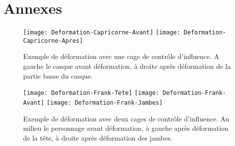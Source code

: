 
\chapter{Annexes}

\graphicspath{{Appendix1/Appendix1Figs/PNG/}{Appendix1/Appendix1Figs/PDF/}{Appendix1/Appendix1Figs/}}

\begin{figure}[ht]
  \begin{center}
    \texttt{[image: Deformation-Capricorne-Avant]}
    \texttt{[image: Deformation-Capricorne-Apres]}

    \caption{Exemple de déformation avec une cage de contrôle d'influence. A
gauche le casque avant déformation, à droite après déformation de la
partie basse du casque.}

  \end{center}
\end{figure}

\begin{figure}[ht]
  \begin{center}
    \texttt{[image: Deformation-Frank-Tete]}
    \texttt{[image: Deformation-Frank-Avant]}
    \texttt{[image: Deformation-Frank-Jambes]}

    \caption{Exemple de déformation avec deux cages de contrôle d'influence.
Au milieu le personnage avant déformation, à gauche après déformation de
la tête, à droite après déformation des jambes.}

  \end{center}
\end{figure}

